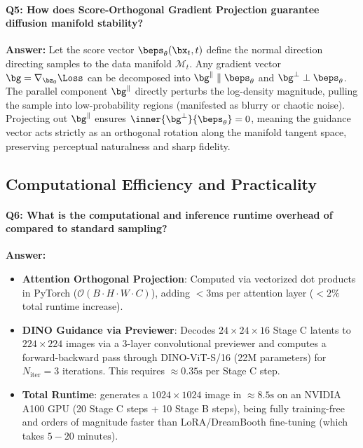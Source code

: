 \paragraph{Q5: How does Score-Orthogonal Gradient Projection guarantee diffusion manifold stability?}
\textbf{Answer:} Let the score vector $\beps_\theta(\bx_t, t)$ define the normal direction directing samples to the data manifold $\mathcal{M}_t$. Any gradient vector $\bg = \nabla_{\bz_0} \Loss$ can be decomposed into $\bg^\parallel \parallel \beps_\theta$ and $\bg^\perp \perp \beps_\theta$. The parallel component $\bg^\parallel$ directly perturbs the log-density magnitude, pulling the sample into low-probability regions (manifested as blurry or chaotic noise). Projecting out $\bg^\parallel$ ensures $\inner{\bg^\perp}{\beps_\theta} = 0$, meaning the guidance vector acts strictly as an orthogonal rotation along the manifold tangent space, preserving perceptual naturalness and sharp fidelity.

\subsection{Computational Efficiency and Practicality}

\paragraph{Q6: What is the computational and inference runtime overhead of \method compared to standard sampling?}
\textbf{Answer:} 
\begin{itemize}
    \item \textbf{Attention Orthogonal Projection}: Computed via vectorized dot products in PyTorch ($\mathcal{O}(B \cdot H \cdot W \cdot C)$), adding $< 3\text{ms}$ per attention layer ($< 2\%$ total runtime increase).
    \item \textbf{DINO Guidance via Previewer}: Decodes $24 \times 24 \times 16$ Stage C latents to $224 \times 224$ images via a 3-layer convolutional previewer and computes a forward-backward pass through DINO-ViT-S/16 (22M parameters) for $N_{\text{iter}} = 3$ iterations. This requires $\approx 0.35\text{s}$ per Stage C step.
    \item \textbf{Total Runtime}: \method generates a $1024 \times 1024$ image in $\approx 8.5\text{s}$ on an NVIDIA A100 GPU (20 Stage C steps + 10 Stage B steps), being fully training-free and orders of magnitude faster than LoRA/DreamBooth fine-tuning (which takes $5 - 20\text{ minutes}$).
\end{itemize}

